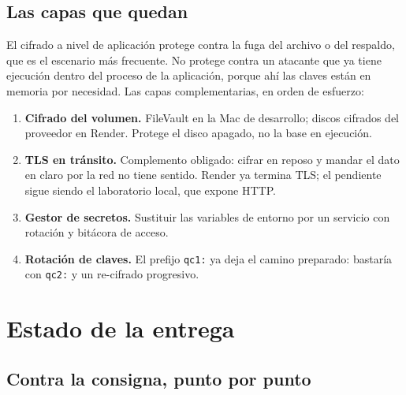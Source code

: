 \documentclass[11pt,letterpaper]{article}
\begin{document}
\subsection{Las capas que quedan}
\label{sec:capas}

El cifrado a nivel de aplicación protege contra la fuga del archivo o del
respaldo, que es el escenario más frecuente. No protege contra un atacante que
ya tiene ejecución dentro del proceso de la aplicación, porque ahí las claves
están en memoria por necesidad. Las capas complementarias, en orden de esfuerzo:

\begin{enumerate}[leftmargin=1.6em,itemsep=3pt]
  \item \textbf{Cifrado del volumen.} FileVault en la Mac de desarrollo; discos
        cifrados del proveedor en Render. Protege el disco apagado, no la base
        en ejecución.
  \item \textbf{TLS en tránsito.} Complemento obligado: cifrar en reposo y
        mandar el dato en claro por la red no tiene sentido. Render ya termina
        TLS; el pendiente sigue siendo el laboratorio local, que expone HTTP.
  \item \textbf{Gestor de secretos.} Sustituir las variables de entorno por un
        servicio con rotación y bitácora de acceso.
  \item \textbf{Rotación de claves.} El prefijo \texttt{qc1:} ya deja el camino
        preparado: bastaría con \texttt{qc2:} y un re-cifrado progresivo.
\end{enumerate}

\section{Estado de la entrega}

\subsection{Contra la consigna, punto por punto}
\end{document}
